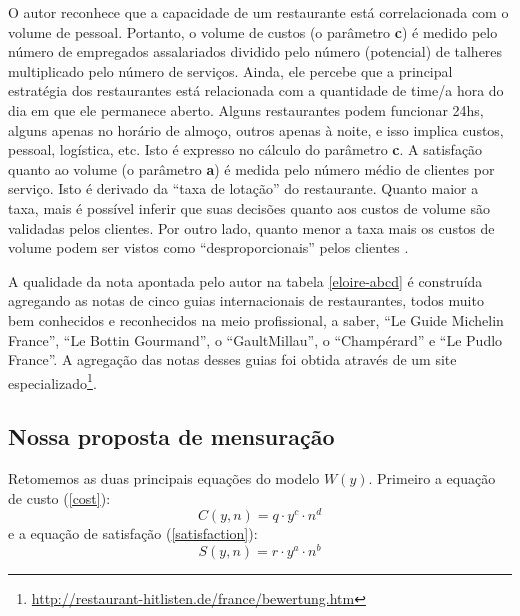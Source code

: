 \documentclass[a4paper, 12pt, openright, oneside, german, french, english, brazil]{abntex2}
\begin{document}
	O autor reconhece que a capacidade de um restaurante está correlacionada com o volume de pessoal. Portanto, o volume de custos (o parâmetro \textbf{c}) é medido pelo número de empregados assalariados dividido pelo número (potencial) de talheres multiplicado pelo número de serviços. Ainda, ele percebe que a principal estratégia dos restaurantes está relacionada com a quantidade de time/a hora do dia em que ele permanece aberto. Alguns restaurantes podem funcionar 24hs, alguns apenas no horário de almoço, outros apenas à noite, e isso implica custos, pessoal, logística, etc. Isto é expresso no cálculo do parâmetro \textbf{c}. A satisfação quanto ao volume (o parâmetro \textbf{a}) é medida pelo número médio de clientes por serviço. Isto é derivado da ``taxa de lotação'' do restaurante. Quanto maior a taxa, mais é possível inferir que suas decisões quanto aos custos de volume são validadas pelos clientes. Por outro lado, quanto menor a taxa mais os custos de volume podem ser vistos como ``desproporcionais'' pelos clientes \cite{eloire2009reseaux}.
	
	
	A qualidade da nota apontada pelo autor na tabela \ref{eloire-abcd} é construída agregando as notas de cinco guias internacionais de restaurantes, todos muito bem conhecidos e reconhecidos na meio profissional, a saber, ``Le Guide Michelin France'', ``Le Bottin Gourmand'', o ``GaultMillau'', o ``Champérard'' e ``Le Pudlo France''. A agregação das notas desses guias foi obtida através de um site especializado\footnote{\url{http://restaurant-hitlisten.de/france/bewertung.htm}}.
	
	
	


	\subsection{Nossa proposta de mensuração}
	
	
	Retomemos as duas principais equações do modelo $W(y)$. Primeiro a equação de custo (\ref{cost}):
	$$C(y, n) = q \cdot y^c \cdot n^d$$
	e a equação de satisfação (\ref{satisfaction}):
	$$S(y, n) = r \cdot y^a \cdot n^b$$
	
\end{document}
